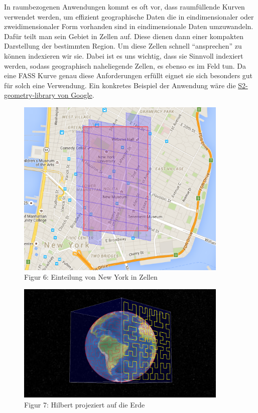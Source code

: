 \documentclass[course=erap]{aspdoc}
\begin{document}
In raumbezogenen Anwendungen kommt es oft vor, dass raumfüllende Kurven verwendet werden, um effizient geographische Daten die in eindimensionaler oder zweidimensionaler Form vorhanden sind in eindimensionale Daten umzuwandeln. \\Dafür teilt man  sein Gebiet in Zellen auf. Diese dienen dann einer kompakten \\ Darstellung der bestimmten Region. Um diese Zellen schnell "`ansprechen"' zu können indexieren wir sie. Dabei ist es uns wichtig, dass sie Sinnvoll indexiert werden, sodass geographisch naheliegende Zellen, es ebenso es im Feld tun.
Da eine FASS Kurve genau diese Anforderungen erfüllt eignet sie sich besonders gut für solch eine Verwendung. Ein konkretes Beispiel der Anwendung wäre die \href{https://code.google.com/archive/p/s2-geometry-library/}{S2-geometry-library von Google}. 

\begin{figure}
    \centering
    \begin{minipage}{0.45\textwidth}
        \centering
        \includegraphics[width=0.9\textwidth]{Map}\\
        \tiny Figur 6: Einteilung von New York in Zellen
    \end{minipage}\hfill
    \begin{minipage}{0.45\textwidth}
        \centering
        \includegraphics[width=0.9\textwidth]{Earth} \\
        \tiny Figur 7: Hilbert projeziert auf die Erde
    \end{minipage}
\end{figure}
\end{document}
